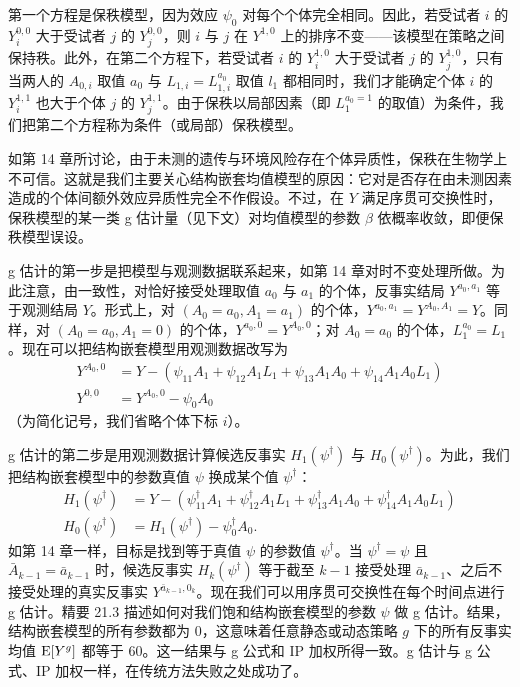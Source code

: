 第一个方程是保秩模型，因为效应 $\psi_0$ 对每个个体完全相同。因此，若受试者 $i$ 的 $Y_i^{0,0}$ 大于受试者 $j$ 的 $Y_j^{0,0}$，则 $i$ 与 $j$ 在 $Y^{1,0}$ 上的排序不变——该模型在策略之间保持秩。此外，在第二个方程下，若受试者 $i$ 的 $Y_i^{1,0}$ 大于受试者 $j$ 的 $Y_j^{1,0}$，只有当两人的 $A_{0,i}$ 取值 $a_0$ 与 $L_{1,i}=L_{1,i}^{a_0}$ 取值 $l_1$ 都相同时，我们才能确定个体 $i$ 的 $Y_i^{1,1}$ 也大于个体 $j$ 的 $Y_j^{1,1}$。由于保秩以局部因素（即 $L_1^{a_0=1}$ 的取值）为条件，我们把第二个方程称为条件（或局部）保秩模型。

如第 14 章所讨论，由于未测的遗传与环境风险存在个体异质性，保秩在生物学上不可信。这就是我们主要关心结构嵌套均值模型的原因：它对是否存在由未测因素造成的个体间额外效应异质性完全不作假设。不过，在 $Y$ 满足序贯可交换性时，保秩模型的某一类 g 估计量（见下文）对均值模型的参数 $\beta$ 依概率收敛，即便保秩模型误设。


g 估计的第一步是把模型与观测数据联系起来，如第 14 章对时不变处理所做。为此注意，由一致性，对恰好接受处理取值 $a_0$ 与 $a_1$ 的个体，反事实结局 $Y^{a_0,a_1}$ 等于观测结局 $Y$。形式上，对 $(A_0=a_0,A_1=a_1)$ 的个体，$Y^{a_0,a_1}=Y^{A_0,A_1}=Y$。同样，对 $(A_0=a_0,A_1=0)$ 的个体，$Y^{a_0,0}=Y^{A_0,0}$；对 $A_0=a_0$ 的个体，$L_1^{a_0}=L_1$。现在可以把结构嵌套模型用观测数据改写为
\[
\begin{aligned}
Y^{A_0,0}&=Y-(\psi_{11}A_1+\psi_{12}A_1L_1+\psi_{13}A_1A_0+\psi_{14}A_1A_0L_1)\\
Y^{0,0}&=Y^{A_0,0}-\psi_0A_0
\end{aligned}
\]
（为简化记号，我们省略个体下标 $i$）。

g 估计的第二步是用观测数据计算候选反事实 $H_1(\psi^\dagger)$ 与 $H_0(\psi^\dagger)$。为此，我们把结构嵌套模型中的参数真值 $\psi$ 换成某个值 $\psi^\dagger$：
\[
\begin{aligned}
H_1(\psi^\dagger)&=Y-\left(\psi^\dagger_{11}A_1+\psi^\dagger_{12}A_1L_1+\psi^\dagger_{13}A_1A_0+\psi^\dagger_{14}A_1A_0L_1\right)\\
H_0(\psi^\dagger)&=H_1(\psi^\dagger)-\psi^\dagger_0A_0.
\end{aligned}
\]
如第 14 章一样，目标是找到等于真值 $\psi$ 的参数值 $\psi^\dagger$。当 $\psi^\dagger=\psi$ 且 $\bar A_{k-1}=\bar a_{k-1}$ 时，候选反事实 $H_k(\psi^\dagger)$ 等于截至 $k-1$ 接受处理 $\bar a_{k-1}$、之后不接受处理的真实反事实 $Y^{\bar a_{k-1},0_k}$。现在我们可以用序贯可交换性在每个时间点进行 g 估计。精要 21.3 描述如何对我们饱和结构嵌套模型的参数 $\psi$ 做 g 估计。结果，结构嵌套模型的所有参数都为 0，这意味着任意静态或动态策略 $g$ 下的所有反事实均值 $\mathrm{E}[Y^g]$ 都等于 60。这一结果与 g 公式和 IP 加权所得一致。g 估计与 g 公式、IP 加权一样，在传统方法失败之处成功了。

